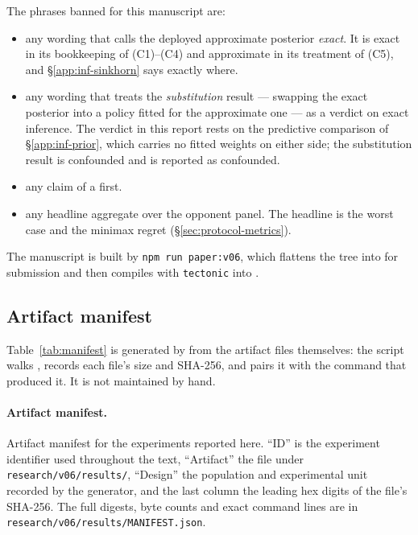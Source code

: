 The phrases banned for this manuscript are:

\begin{itemize}
  \item any wording that calls the deployed approximate posterior \emph{exact}.
        It is exact in its bookkeeping of (C1)--(C4) and approximate in its
        treatment of (C5), and \S\ref{app:inf-sinkhorn} says exactly where.
  \item any wording that treats the \emph{substitution} result --- swapping the
        exact posterior into a policy fitted for the approximate one --- as a
        verdict on exact inference. The verdict in this report rests on the
        predictive comparison of \S\ref{app:inf-prior}, which carries no fitted
        weights on either side; the substitution result is confounded and is
        reported as confounded.
  \item any claim of a first.
  \item any headline aggregate over the opponent panel. The headline is the worst
        case and the minimax regret (\S\ref{sec:protocol-metrics}).
\end{itemize}

The manuscript is built by \verb|npm run paper:v06|, which flattens the
\verb|| tree into  for
submission and then compiles  with
\texttt{tectonic} into .

\subsection{Artifact manifest}
\label{app:repro-manifest}

Table~\ref{tab:manifest} is generated by  from
the artifact files themselves: the script walks
, records each file's size and SHA-256, and pairs
it with the command that produced it. It is not maintained by hand.

\label{tab:manifest}\paragraph{Artifact manifest.} Artifact manifest for the experiments reported here. ``ID'' is the
experiment identifier used throughout the text, ``Artifact'' the file under
\texttt{research/v06/results/}, ``Design'' the population and experimental unit
recorded by the generator, and the last column the leading hex digits of the
file's SHA-256. The full digests, byte counts and exact command lines are in
\texttt{research/v06/results/MANIFEST.json}.

